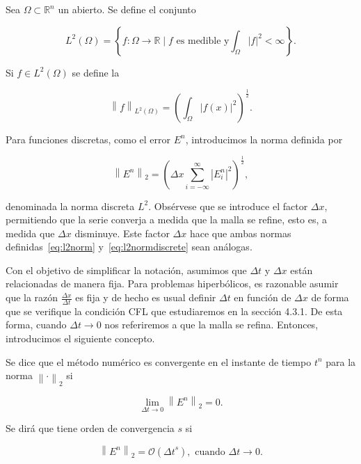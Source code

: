 \begin{definition}
  Sea $\Omega\subset\mathbb{R}^{n}$ un abierto.
  Se define el conjunto

  \begin{equation*}
    L^{2}\left(\Omega\right)=
    \left\{
    f\colon\Omega\to\mathbb{R}\mid
    f\text{ es medible y}
    \int_{\Omega}\left|f\right|^{2}<\infty
    \right\}.
  \end{equation*}

  Si $f\in L^{2}\left(\Omega\right)$ se define la

  \begin{equation}\label{eq:l2norm}
    {\left\|f\right\|}_{L^{2}\left(\Omega\right)}=
      {\left(
        \int_{\Omega}
        \left|f\left(x\right)\right|^{2}
        \right)}^{\frac{1}{2}}.
  \end{equation}
\end{definition}

Para funciones discretas, como el error $E^{n}$, introducimos la
norma definida por

\begin{equation}\label{eq:l2normdiscrete}
  {\left\|E^{n}\right\|}_{2}=
    {
      \left(
      \Delta x
      \sum_{i=-\infty}^{\infty}
      {\left|E^{n}_{i}\right|}^{2}
      \right)
    }^{\frac{1}{2}},
\end{equation}

denominada la norma discreta $L^{2}$.
Obsérvese que se introduce el factor $\Delta x$, permitiendo que la
serie converja a medida que la malla se refine, esto es, a medida que
$\Delta x$ disminuye.
Este factor $\Delta x$ hace que ambas normas
definidas~\eqref{eq:l2norm} y~\eqref{eq:l2normdiscrete} sean
análogas.

Con el objetivo de simplificar la notación, asumimos que $\Delta t$ y
$\Delta x$ están relacionadas de manera fija.
Para problemas hiperbólicos, es razonable asumir que la razón
\begin{math}
  \frac{\Delta x}{\Delta t}
\end{math}
es fija y de hecho es usual definir $\Delta t$ en función de
$\Delta x$ de forma que se verifique la condición CFL que
estudiaremos en la sección 4.3.1.
De esta forma, cuando $\Delta t\to 0$ nos referiremos a que la malla
se refina.
Entonces, introducimos el siguiente concepto.

\begin{definition}
  Se dice que el método numérico es convergente en el instante de
  tiempo $t^{n}$ para la norma ${\left\|\cdot\right\|}_{2}$ si

  \begin{equation*}
    \lim_{\Delta t\to0}
    {\left\|E^{n}\right\|}_{2}=
    0.
  \end{equation*}

  Se dirá que tiene orden de convergencia $s$ si

  \begin{equation*}
    \left\|
    E^{n}
    \right\|_{2}=
    \mathcal{O}
    \left({\Delta t}^{s}\right),
    \text{ cuando }
    \Delta t\to 0.
  \end{equation*}
\end{definition}

